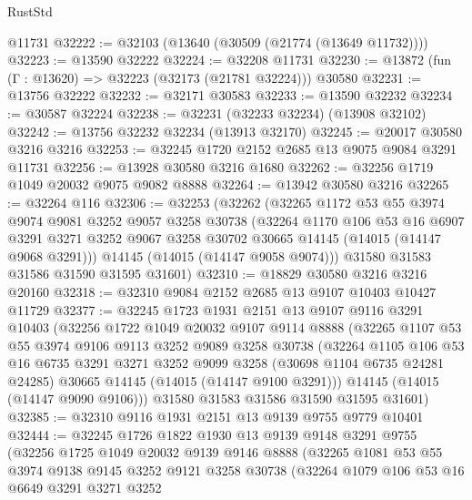\begin{lexlean}{RustStd}
\begin{coremodule}
    @11731
@32222 := @32103 (@13640 (@30509 (@21774 (@13649 @11732))))
@32223 := @13590 @32222
@32224 := @32208 @11731
@32230 := @13872 (fun (Γ : @13620) => @32223 (@32173 (@21781 @32224))) @30580
@32231 := @13756 @32222
@32232 := @32171 @30583
@32233 := @13590 @32232
@32234 := @30587 @32224
@32238 := @32231 (@32233 @32234) (@13908 @32102)
@32242 := @13756 @32232 @32234 (@13913 @32170)
@32245 := @20017 @30580 @3216 @3216
@32253 := @32245 @1720 @2152 @2685 @13 @9075 @9084 @3291 @11731
@32256 := @13928 @30580 @3216 @1680
@32262 := @32256 @1719 @1049 @20032 @9075 @9082 @8888
@32264 := @13942 @30580 @3216
@32265 := @32264 @116
@32306 := @32253
    (@32262
      (@32265
        @1172
        @53
        @55
        @3974
        @9074
        @9081
        @3252
        @9057
        @3258
        @30738
        (@32264
          @1170
          @106
          @53
          @16
          @6907
          @3291
          @3271
          @3252
          @9067
          @3258
          @30702
          @30665
          @14145
          (@14015 (@14147 @9068 @3291)))
        @14145
        (@14015 (@14147 @9058 @9074)))
      @31580
      @31583
      @31586
      @31590
      @31595
      @31601)
@32310 := @18829 @30580 @3216 @3216 @20160
@32318 := @32310 @9084 @2152 @2685 @13 @9107 @10403 @10427 @11729
@32377 := @32245
    @1723
    @1931
    @2151
    @13
    @9107
    @9116
    @3291
    @10403
    (@32256
      @1722
      @1049
      @20032
      @9107
      @9114
      @8888
      (@32265
        @1107
        @53
        @55
        @3974
        @9106
        @9113
        @3252
        @9089
        @3258
        @30738
        (@32264
          @1105
          @106
          @53
          @16
          @6735
          @3291
          @3271
          @3252
          @9099
          @3258
          (@30698 @1104 @6735 @24281 @24285)
          @30665
          @14145
          (@14015 (@14147 @9100 @3291)))
        @14145
        (@14015 (@14147 @9090 @9106)))
      @31580
      @31583
      @31586
      @31590
      @31595
      @31601)
@32385 := @32310 @9116 @1931 @2151 @13 @9139 @9755 @9779 @10401
@32444 := @32245
    @1726
    @1822
    @1930
    @13
    @9139
    @9148
    @3291
    @9755
    (@32256
      @1725
      @1049
      @20032
      @9139
      @9146
      @8888
      (@32265
        @1081
        @53
        @55
        @3974
        @9138
        @9145
        @3252
        @9121
        @3258
        @30738
        (@32264
          @1079
          @106
          @53
          @16
          @6649
          @3291
          @3271
          @3252

\end{coremodule}
\end{lexlean}

